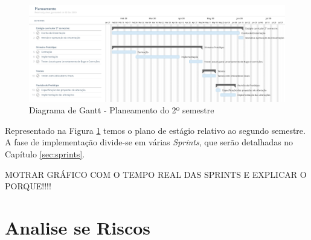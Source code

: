 \begin{figure}[ht!]
	\begin{center}
		\includegraphics[width=1\textwidth]{img/gantt/semestre2.jpeg}
		\caption{Diagrama de Gantt - Planeamento do 2º semestre}
		\label{fig:gantt2}
	\end{center}
\end{figure}

Representado na Figura \ref{fig:gantt2} temos o plano de estágio relativo ao segundo semestre. A fase de implementação divide-se em várias \textit{Sprints}, que serão detalhadas no Capítulo \ref{sec:sprints}.



MOTRAR GRÁFICO COM O TEMPO REAL DAS SPRINTS E EXPLICAR O PORQUE!!!!


\section{Analise se Riscos}
\label{analiseriscos}
\blankpage

\glsresetall



